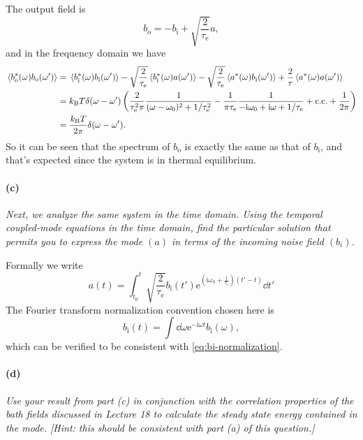\documentclass[hyperref, a4paper]{article}
\newcommand*{\ii}{\mathrm{i}}
\newcommand*{\ee}{\mathrm{e}}
\newcommand*{\kB}{k_{\text{B}}}
\newcommand*{\taue}{\tau_{\text{e}}}
\newcommand*{\bi}{b_{\text{i}}}
\newcommand*{\bo}{b_{\text{o}}}
\begin{document}
The output field is
\begin{equation}
    \bo = - \bi + \sqrt{\frac{2}{\taue}} a,
\end{equation}
and in the frequency domain we have 
\begin{equation}
    \begin{aligned}
        \expval*{\bo^*(\omega) \bo(\omega')} &= 
        \expval*{\bi^*(\omega) \bi(\omega')}
        - \sqrt{\frac{2}{\taue}} \expval*{\bi^*(\omega) a(\omega')}
        - \sqrt{\frac{2}{\taue}} \expval*{a^*(\omega) \bi(\omega')}
        + \frac{2}{\tau} \expval*{a^*(\omega) a(\omega')} \\
        &= \kB T \delta(\omega - \omega')
        \left(
            \frac{2}{\taue^2 \pi} \frac{1}{(\omega - \omega_0)^2 + 1 / \taue^2}
            - \frac{1}{\pi \taue} \frac{1}{- \ii \omega_0 + \ii \omega + 1 / \taue} + \text{c.c.}
            + \frac{1}{2\pi} 
        \right) \\
        &= \frac{\kB T}{2\pi} \delta(\omega - \omega').
    \end{aligned}
\end{equation}
So it can be seen that the spectrum of $\bo$ is exactly the same as that of $\bi$,
and that's expected since the system is in thermal equilibrium.

\paragraph*{(c)} \textit{Next, we analyze the same system in the time domain. Using the temporal coupled-mode equations in the time domain, find the particular solution that permits you to express the mode $(a)$ in terms of the incoming noise field $\left(b_i\right)$.} 

Formally we write 
\begin{equation}
    a(t) = \int_{t_0}^{t} \sqrt{\frac{2}{\taue}} \bi(t') 
    \ee^{\left(\ii \omega_0 + \frac{1}{\taue}\right) (t' - t)} \dd{t'}
\end{equation}
The Fourier transform normalization convention chosen here is 
\begin{equation}
    \bi(t) = \int \dd{\omega} \ee^{- \ii \omega t} \bi(\omega),
\end{equation}
which can be verified to be consistent with \eqref{eq:bi-normalization}.

\paragraph*{(d)} \textit{Use your result from part (c) in conjunction with the correlation properties of the bath fields discussed in Lecture 18 to calculate the steady state energy contained in the mode. [Hint: this should be consistent with part (a) of this question.]} 
\end{document}
